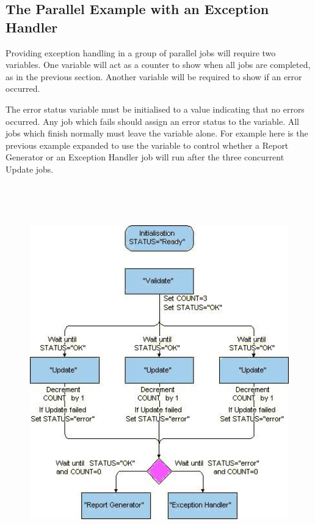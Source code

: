 \subsection{The Parallel Example with an Exception Handler}
Providing exception handling in a group of parallel jobs will require two variables. One variable will act as a counter to show when all jobs
are completed, as in the previous section. Another variable will be required to show if an error occurred.

The error status variable must be initialised to a value indicating that no errors occurred. Any job which fails should assign an error status
to the variable. All jobs which finish normally must leave the variable alone. For example here is the previous example expanded to use the
variable  to control whether a Report Generator or an Exception Handler job will run after the three
concurrent Update jobs.

\begin{figure}
\centering
\includegraphics[width=16.378cm,height=16.265cm]{img/ref9.jpg}
\end{figure}
